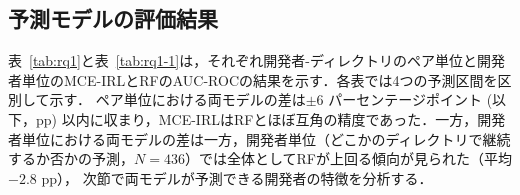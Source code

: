 \documentclass[submit,noauthor,ses,dvipdfmx]{ipsj}
\newcommand{\todo}[1]{\colorbox{yellow}{{\bf TODO}:}{\color{red} {\textbf{[#1]}}}}
\begin{document}


\subsection{予測モデルの評価結果}

表~\ref{tab:rq1}と表~\ref{tab:rq1-1}は，それぞれ開発者-ディレクトリのペア単位と開発者単位のMCE-IRLとRFのAUC-ROCの結果を示す．各表では4つの予測区間を区別して示す．
ペア単位における両モデルの差は$\pm6$ パーセンテージポイント (以下，pp) 以内に収まり，MCE-IRLはRFとほぼ互角の精度であった．一方，開発者単位における両モデルの差は一方，開発者単位（どこかのディレクトリで継続するか否かの予測，$N=436$）では全体としてRFが上回る傾向が見られた（平均$-2.8$ pp），
次節で両モデルが予測できる開発者の特徴を分析する．


\end{document}

